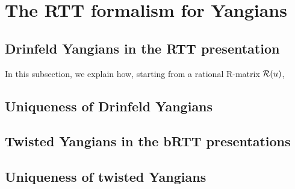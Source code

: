 \section{The RTT formalism for Yangians}
    \subsection{Drinfeld Yangians in the RTT presentation}
        In this subsection, we explain how, starting from a rational R-matrix $\mathcal{R}(u)$, 

    \subsection{Uniqueness of Drinfeld Yangians}

    \subsection{Twisted Yangians in the bRTT presentations}

    \subsection{Uniqueness of twisted Yangians}